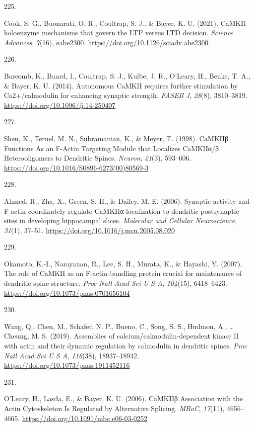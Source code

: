 \documentclass[
  11pt,
  letterpaper,
]{scrreprt}
\newlength{\cslhangindent}
\newlength{\csllabelwidth}
\newenvironment{CSLReferences}[2] %
 {\begin{list}{}{%
  \setlength{\itemindent}{0pt}
  \setlength{\leftmargin}{0pt}
  \setlength{\parsep}{0pt}
  \ifodd #1
   \setlength{\leftmargin}{\cslhangindent}
   \setlength{\itemindent}{-1\cslhangindent}
  \fi
  \setlength{\itemsep}{#2\baselineskip}}}
 {\end{list}}
\newcommand{\CSLLeftMargin}[1]{\parbox[t]{\csllabelwidth}{\strut#1\strut}}
\newcommand{\CSLRightInline}[1]{\parbox[t]{\linewidth - \csllabelwidth}{\strut#1\strut}}
\begin{document}
\begin{CSLReferences}{0}{0}
\CSLLeftMargin{225. }%
\CSLRightInline{Cook, S. G., Buonarati, O. R., Coultrap, S. J., \&
Bayer, K. U. (2021). {CaMKII} holoenzyme mechanisms that govern the
{LTP} versus {LTD} decision. \emph{Science Advances}, \emph{7}(16),
eabe2300. \url{https://doi.org/10.1126/sciadv.abe2300}}

\CSLLeftMargin{226. }%
\CSLRightInline{Barcomb, K., Buard, I., Coultrap, S. J., Kulbe, J. R.,
O'Leary, H., Benke, T. A., \& Bayer, K. U. (2014). Autonomous {CaMKII}
requires further stimulation by {Ca2}+/calmodulin for enhancing synaptic
strength. \emph{FASEB J}, \emph{28}(8), 3810--3819.
\url{https://doi.org/10.1096/fj.14-250407}}

\CSLLeftMargin{227. }%
\CSLRightInline{Shen, K., Teruel, M. N., Subramanian, K., \& Meyer, T.
(1998). {CaMKIIβ Functions As} an {F-Actin Targeting Module} that
{Localizes CaMKIIα}/β {Heterooligomers} to {Dendritic Spines}.
\emph{Neuron}, \emph{21}(3), 593--606.
\url{https://doi.org/10.1016/S0896-6273(00)80569-3}}

\CSLLeftMargin{228. }%
\CSLRightInline{Ahmed, R., Zha, X., Green, S. H., \& Dailey, M. E.
(2006). Synaptic activity and {F-actin} coordinately regulate {CaMKIIα}
localization to dendritic postsynaptic sites in developing hippocampal
slices. \emph{Molecular and Cellular Neuroscience}, \emph{31}(1),
37--51. \url{https://doi.org/10.1016/j.mcn.2005.08.020}}

\CSLLeftMargin{229. }%
\CSLRightInline{Okamoto, K.-I., Narayanan, R., Lee, S. H., Murata, K.,
\& Hayashi, Y. (2007). The role of {CaMKII} as an {F-actin-bundling}
protein crucial for maintenance of dendritic spine structure. \emph{Proc
Natl Acad Sci U S A}, \emph{104}(15), 6418--6423.
\url{https://doi.org/10.1073/pnas.0701656104}}

\CSLLeftMargin{230. }%
\CSLRightInline{Wang, Q., Chen, M., Schafer, N. P., Bueno, C., Song, S.
S., Hudmon, A., \ldots{} Cheung, M. S. (2019). Assemblies of
calcium/calmodulin-dependent kinase {II} with actin and their dynamic
regulation by calmodulin in dendritic spines. \emph{Proc Natl Acad Sci U
S A}, \emph{116}(38), 18937--18942.
\url{https://doi.org/10.1073/pnas.1911452116}}

\CSLLeftMargin{231. }%
\CSLRightInline{O'Leary, H., Lasda, E., \& Bayer, K. U. (2006). {CaMKIIβ
Association} with the {Actin Cytoskeleton Is Regulated} by {Alternative
Splicing}. \emph{MBoC}, \emph{17}(11), 4656--4665.
\url{https://doi.org/10.1091/mbc.e06-03-0252}}


\end{CSLReferences}
\end{document}
